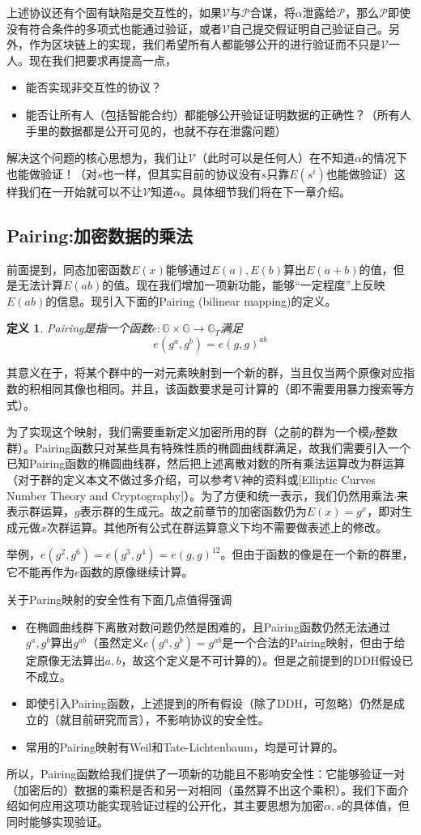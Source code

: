 \documentclass[12pt]{article}
\newcommand{\pp}{$\mathcal{P}$}
\newcommand{\vv}{$\mathcal{V}$}
\newtheorem{definition}{定义}
\begin{document}
上述协议还有个固有缺陷是交互性的，如果\vv 与\pp 合谋，将$\alpha$泄露给\pp，那么\pp 即使没有符合条件的多项式也能通过验证，或者\vv 自己提交假证明自己验证自己。另外，作为区块链上的实现，我们希望所有人都能够公开的进行验证而不只是\vv 一人。现在我们把要求再提高一点，
\begin{itemize}
    \item 能否实现非交互性的协议？
    \item 能否让所有人（包括智能合约）都能够公开验证证明数据的正确性？（所有人手里的数据都是公开可见的，也就不存在泄露问题）
\end{itemize}
解决这个问题的核心思想为，我们让\vv （此时可以是任何人）在不知道$\alpha$的情况下也能做验证！（对$s$也一样，但其实目前的协议没有$s$只靠$E(s^i)$也能做验证）这样我们在一开始就可以不让\vv 知道$\alpha$。具体细节我们将在下一章介绍。
\subsection{Pairing:加密数据的乘法}
前面提到，同态加密函数$E(x)$能够通过$E(a),E(b)$算出$E(a+b)$的值，但是无法计算$E(ab)$的值。现在我们增加一项新功能，能够“一定程度”上反映$E(ab)$的信息。现引入下面的Pairing (bilinear mapping)的定义。
\begin{definition}
	Pairing是指一个函数$e: \mathbb{G}\times \mathbb{G} \rightarrow \mathbb{G}_T$满足
	$$e(g^a,g^b) = e(g,g)^{ab}$$
\end{definition}
其意义在于，将某个群中的一对元素映射到一个新的群，当且仅当两个原像对应指数的积相同其像也相同。并且，该函数要求是可计算的（即不需要用暴力搜索等方式）。

为了实现这个映射，我们需要重新定义加密所用的群（之前的群为一个模$p$整数群）。Pairing函数只对某些具有特殊性质的椭圆曲线群满足，故我们需要引入一个已知Pairing函数的椭圆曲线群，然后把上述离散对数的所有乘法运算改为群运算（对于群的定义本文不做过多介绍，可以参考V神的资料或[Elliptic Curves Number Theory and Cryptography]）。为了方便和统一表示，我们仍然用乘法$\cdot$来表示群运算，$g$表示群的生成元。故之前章节的加密函数仍为$E(x)=g^x$，即对生成元做$x$次群运算。其他所有公式在群运算意义下均不需要做表述上的修改。

举例，$e(g^2,g^6)=e(g^3,g^4)=e(g,g)^{12}$。但由于函数的像是在一个新的群里，它不能再作为$e$函数的原像继续计算。

关于Paring映射的安全性有下面几点值得强调
\begin{itemize}
	\item 在椭圆曲线群下离散对数问题仍然是困难的，且Pairing函数仍然无法通过$g^{a},g^b$算出$g^{ab}$（虽然定义$e(g^a,g^b)=g^{ab}$是一个合法的Pairing映射，但由于给定原像无法算出$a,b$，故这个定义是不可计算的）。但是之前提到的DDH假设已不成立。
	\item 即使引入Pairing函数，上述提到的所有假设（除了DDH，可忽略）仍然是成立的（就目前研究而言），不影响协议的安全性。
	\item 常用的Pairing映射有Weil和Tate-Lichtenbaum，均是可计算的。
\end{itemize}
所以，Pairing函数给我们提供了一项新的功能且不影响安全性：它能够验证一对（加密后的）数据的乘积是否和另一对相同（虽然算不出这个乘积）。我们下面介绍如何应用这项功能实现验证过程的公开化，其主要思想为加密$\alpha,s$的具体值，但同时能够实现验证。
\end{document}
